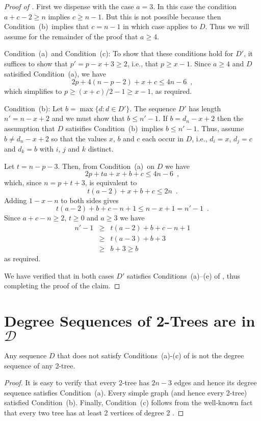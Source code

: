 \documentclass[lotsofwhite,charterfonts]{patmorin}
\newcommand{\degreesum}{Condition~(a)}
\newcommand{\maxdegree}{Condition~(b)}
\newcommand{\twotwos}{Condition~(c)}
\begin{document}
\begin{proof}[Proof of ]
First we dispense with the case $a=3$.  In this case the condition
$a+c-2\ge n$ implies $c\ge n-1$.  But this is not possible because
then \maxdegree\ implies that $c=n-1$ in which case
 applies to $D$.  Thus we will assume for the
remainder of the proof that $a\ge 4$.

\noindent\degreesum\ and \twotwos:  To show that these conditions hold
for $D'$, it suffices to show that $p'=p-x+3\ge 2$, i.e., that $p\ge
x-1$.  Since $a\ge 4$ and $D$ satisified
\degreesum, we have 
\[
             2p+4(n-p-2)+x+c \le 4n-6 \enspace ,
\]
which simplifies to $p\ge (x+c)/2-1\ge x-1$, as required.

\noindent\maxdegree:  Let $b=\max\{d:d\in D'\}$.  The sequence $D'$
has length $n'=n-x+2$ and we must show that $b\le n'-1$.  If
$b=d_n-x+2$ then the assumption that $D$ satisifies \maxdegree\
implies $b\le n'-1$.  Thus, assume $b\neq d_{n}-x+2$ so that the values
$x$, $b$ and $c$ each occur in $D$, i.e., $d_i=x$, $d_j=c$ and $d_k=b$
with $i$, $j$ and $k$ distinct.

Let $t=n-p-3$.  Then, from \degreesum\ on $D$ we have
\[
     2p + ta + x + b + c  \le 4n-6 \enspace , 
\]
which, since $n=p+t+3$, is equivalent to 
\[
     t(a-2) + x + b + c  \le 2n \enspace .
\]
Adding $1-x-n$ to both sides gives
\[
     t(a-2) + b + c - n + 1\le n - x + 1 = n' - 1\enspace .
\]
Since $a+c-n \ge 2$, $t\ge 0$ and $a\ge 3$ we have
\begin{eqnarray*}
     n'-1 & \ge & t(a-2) + b + c - n + 1 \\
          & \ge & t(a-3) + b + 3 \\
          & \ge & b+3 \ge b
\end{eqnarray*}
as required.

We have verified that in both cases $D'$ satisfies
Conditions~(a)--(e) of , thus completing the proof of the
claim.
\end{proof}


\section{Degree Sequences of 2-Trees are in $\mathcal{D}$}

\begin{lem}
Any sequence $D$ that does not satisfy Conditions~(a)-(c) of
 is not the degree sequence of any 2-tree.
\end{lem}

\begin{proof}
It is easy to verify that every 2-tree has $2n-3$ edges and hence
its degree sequence satisfies Condition~(a).
Every simple graph (and hence every 2-tree) satisfied Condition~(b).
Finally, Condition~(c) follows from the 
well-known fact that every two tree has at least 2 vertices of degree
2 \cite{X}.
\end{proof}
\end{document}
